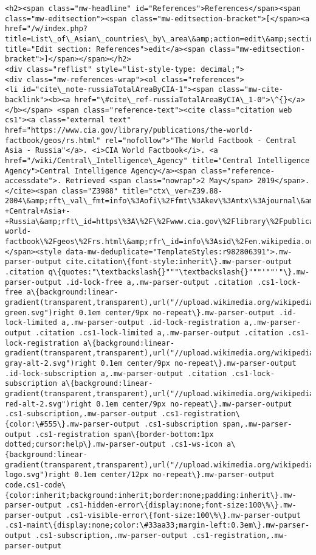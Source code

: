 \documentclass[11pt]{article}
\begin{document}
\begin{Verbatim}[commandchars=\\\{\}]
<h2><span class="mw-headline" id="References">References</span><span class="mw-editsection"><span class="mw-editsection-bracket">[</span><a href="/w/index.php?title=List\_of\_Asian\_countries\_by\_area\&amp;action=edit\&amp;section=2" title="Edit section: References">edit</a><span class="mw-editsection-bracket">]</span></span></h2>
<div class="reflist" style="list-style-type: decimal;">
<div class="mw-references-wrap"><ol class="references">
<li id="cite\_note-russiaTotalAreaByCIA-1"><span class="mw-cite-backlink"><b><a href="\#cite\_ref-russiaTotalAreaByCIA\_1-0">\^{}</a></b></span> <span class="reference-text"><cite class="citation web cs1"><a class="external text" href="https://www.cia.gov/library/publications/the-world-factbook/geos/rs.html" rel="nofollow">"The World Factbook - Central Asia - Russia"</a>. <i>CIA World Factbook</i>. <a href="/wiki/Central\_Intelligence\_Agency" title="Central Intelligence Agency">Central Intelligence Agency</a><span class="reference-accessdate">. Retrieved <span class="nowrap">2 May</span> 2019</span>.</cite><span class="Z3988" title="ctx\_ver=Z39.88-2004\&amp;rft\_val\_fmt=info\%3Aofi\%2Ffmt\%3Akev\%3Amtx\%3Ajournal\&amp;rft.genre=unknown\&amp;rft.jtitle=CIA+World+Factbook\&amp;rft.atitle=The+World+Factbook+-+Central+Asia+-+Russia\&amp;rft\_id=https\%3A\%2F\%2Fwww.cia.gov\%2Flibrary\%2Fpublications\%2Fthe-world-factbook\%2Fgeos\%2Frs.html\&amp;rfr\_id=info\%3Asid\%2Fen.wikipedia.org\%3AList+of+Asian+countries+by+area"></span><style data-mw-deduplicate="TemplateStyles:r982806391">.mw-parser-output cite.citation\{font-style:inherit\}.mw-parser-output .citation q\{quotes:"\textbackslash{}"""\textbackslash{}"""'""'"\}.mw-parser-output .id-lock-free a,.mw-parser-output .citation .cs1-lock-free a\{background:linear-gradient(transparent,transparent),url("//upload.wikimedia.org/wikipedia/commons/6/65/Lock-green.svg")right 0.1em center/9px no-repeat\}.mw-parser-output .id-lock-limited a,.mw-parser-output .id-lock-registration a,.mw-parser-output .citation .cs1-lock-limited a,.mw-parser-output .citation .cs1-lock-registration a\{background:linear-gradient(transparent,transparent),url("//upload.wikimedia.org/wikipedia/commons/d/d6/Lock-gray-alt-2.svg")right 0.1em center/9px no-repeat\}.mw-parser-output .id-lock-subscription a,.mw-parser-output .citation .cs1-lock-subscription a\{background:linear-gradient(transparent,transparent),url("//upload.wikimedia.org/wikipedia/commons/a/aa/Lock-red-alt-2.svg")right 0.1em center/9px no-repeat\}.mw-parser-output .cs1-subscription,.mw-parser-output .cs1-registration\{color:\#555\}.mw-parser-output .cs1-subscription span,.mw-parser-output .cs1-registration span\{border-bottom:1px dotted;cursor:help\}.mw-parser-output .cs1-ws-icon a\{background:linear-gradient(transparent,transparent),url("//upload.wikimedia.org/wikipedia/commons/4/4c/Wikisource-logo.svg")right 0.1em center/12px no-repeat\}.mw-parser-output code.cs1-code\{color:inherit;background:inherit;border:none;padding:inherit\}.mw-parser-output .cs1-hidden-error\{display:none;font-size:100\%\}.mw-parser-output .cs1-visible-error\{font-size:100\%\}.mw-parser-output .cs1-maint\{display:none;color:\#33aa33;margin-left:0.3em\}.mw-parser-output .cs1-subscription,.mw-parser-output .cs1-registration,.mw-parser-output 
\end{Verbatim}
\end{document}

